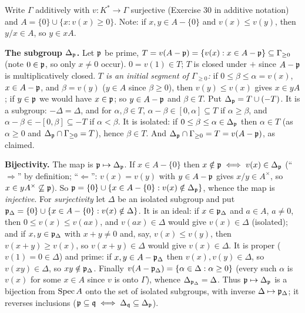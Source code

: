 \documentclass[11pt]{article}
\begin{document}
\pf
Write $\Gamma$ additively with $v:K^*\to\Gamma$ surjective (Exercise 30 in additive notation) and $A=\{0\}\cup\{x:v(x)\ge0\}$. Note: if $x,y\in A-\{0\}$ and $v(x)\le v(y)$, then $y/x\in A$, so $y\in xA$.

\textbf{The subgroup $\Delta_\mathfrak p$.} Let $\mathfrak p$ be prime, $T=v(A-\mathfrak p)=\{v(x):x\in A-\mathfrak p\}\subseteq\Gamma_{\ge0}$ (note $0\in\mathfrak p$, so only $x\ne0$ occur). $0=v(1)\in T$; $T$ is closed under $+$ since $A-\mathfrak p$ is multiplicatively closed. \emph{$T$ is an initial segment of $\Gamma_{\ge0}$:} if $0\le\beta\le\alpha=v(x)$, $x\in A-\mathfrak p$, and $\beta=v(y)$ ($y\in A$ since $\beta\ge0$), then $v(y)\le v(x)$ gives $x\in yA$; if $y\in\mathfrak p$ we would have $x\in\mathfrak p$; so $y\in A-\mathfrak p$ and $\beta\in T$. Put $\Delta_\mathfrak p=T\cup(-T)$. It is a subgroup: $-\Delta=\Delta$, and for $\alpha,\beta\in T$, $\alpha-\beta\in[0,\alpha]\subseteq T$ if $\alpha\ge\beta$, and $\alpha-\beta\in-[0,\beta]\subseteq-T$ if $\alpha<\beta$. It is isolated: if $0\le\beta\le\alpha\in\Delta_\mathfrak p$ then $\alpha\in T$ (as $\alpha\ge0$ and $\Delta_\mathfrak p\cap\Gamma_{\ge0}=T$), hence $\beta\in T$. And $\Delta_\mathfrak p\cap\Gamma_{\ge0}=T=v(A-\mathfrak p)$, as claimed.

\textbf{Bijectivity.} The map is $\mathfrak p\mapsto\Delta_\mathfrak p$. If $x\in A-\{0\}$ then $x\notin\mathfrak p\iff v(x)\in\Delta_\mathfrak p$ (``$\Rightarrow$'' by definition; ``$\Leftarrow$'': $v(x)=v(y)$ with $y\in A-\mathfrak p$ gives $x/y\in A^\times$, so $x\in y A^\times\not\subseteq\mathfrak p$). So $\mathfrak p=\{0\}\cup\{x\in A-\{0\}:v(x)\notin\Delta_\mathfrak p\}$, whence the map is \emph{injective}. For \emph{surjectivity} let $\Delta$ be an isolated subgroup and put $\mathfrak p_\Delta=\{0\}\cup\{x\in A-\{0\}:v(x)\notin\Delta\}$. It is an ideal: if $x\in\mathfrak p_\Delta$ and $a\in A$, $a\ne0$, then $0\le v(x)\le v(ax)$, and $v(ax)\in\Delta$ would give $v(x)\in\Delta$ (isolated); and if $x,y\in\mathfrak p_\Delta$ with $x+y\ne0$ and, say, $v(x)\le v(y)$, then $v(x+y)\ge v(x)$, so $v(x+y)\in\Delta$ would give $v(x)\in\Delta$. It is proper ($v(1)=0\in\Delta$) and prime: if $x,y\in A-\mathfrak p_\Delta$ then $v(x),v(y)\in\Delta$, so $v(xy)\in\Delta$, so $xy\notin\mathfrak p_\Delta$. Finally $v(A-\mathfrak p_\Delta)=\{\alpha\in\Delta:\alpha\ge0\}$ (every such $\alpha$ is $v(x)$ for some $x\in A$ since $v$ is onto $\Gamma$), whence $\Delta_{\mathfrak p_\Delta}=\Delta$. Thus $\mathfrak p\mapsto\Delta_\mathfrak p$ is a bijection from $\operatorname{Spec} A$ onto the set of isolated subgroups, with inverse $\Delta\mapsto\mathfrak p_\Delta$; it reverses inclusions ($\mathfrak p\subseteq\mathfrak q\iff\Delta_\mathfrak q\subseteq\Delta_\mathfrak p$).
\end{document}

